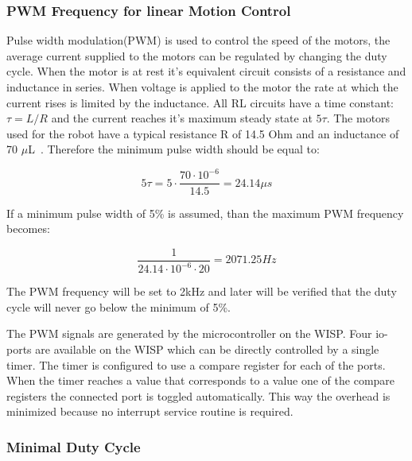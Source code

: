 \subsubsection{PWM Frequency for linear Motion Control}

Pulse width modulation(PWM) is used to control the speed of the motors, the average current supplied to the motors can be regulated by changing the duty cycle.
When the motor is at rest it's equivalent circuit consists of a resistance and inductance in series.
When voltage is applied to the motor the rate at which the current rises is limited by the inductance. 
All RL circuits have a time constant: $\tau = L / R$ and the current reaches it's maximum steady state at $5\tau$. 
The motors used for the robot have a typical resistance R of 14.5 Ohm and an inductance of 70 $\mu$L~\cite{gearmotor_206-110_2017}.
Therefore the minimum pulse width should be equal to:

\begin{equation}
	5\tau = 5 \cdot \frac{70 \cdot 10^{-6}}{14.5} = 24.14 \mu s
\end{equation}

If a minimum pulse width of 5\% is assumed, than the maximum PWM frequency becomes:

\begin{equation}
	\frac{1}{24.14 \cdot 10^{-6} \cdot 20 } = 2071.25 Hz
\end{equation}

The PWM frequency will be set to 2kHz and later will be verified that the duty cycle will never go below the minimum of 5\%.

The PWM signals are generated by the microcontroller on the WISP.
Four io-ports are available on the WISP which can be directly controlled by a single timer.
The timer is configured to use a compare register for each of the ports.
When the timer reaches a value that corresponds to a value one of the compare registers the connected port is toggled automatically.
This way the overhead is minimized because no interrupt service routine is required.

\subsubsection{Minimal Duty Cycle}

